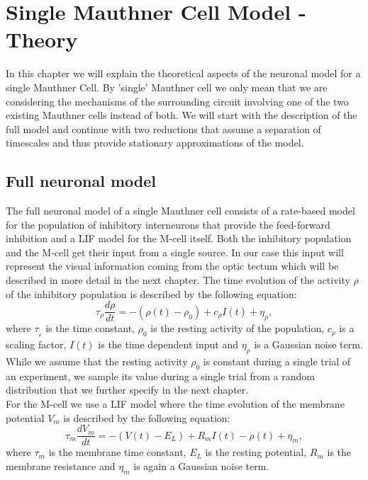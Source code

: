 \chapter{Single Mauthner Cell Model - Theory}
	In this chapter we will explain the theoretical aspects of the neuronal model for a single 
	Mauthner Cell.
	By 'single' Mauthner cell we only mean that we are considering the mechanisms of the 
	surrounding circuit involving one of the two existing Mauthner cells instead of both.
	We will start with the description of the full model and continue with two reductions that 
	assume a separation of timescales and thus provide stationary approximations of the model.
	\section{Full neuronal model}
	The full neuronal model of a single Mauthner cell consists of a rate-based model for the 
	population of inhibitory interneurons that provide the feed-forward inhibition and a LIF model 
	for the M-cell itself.
	Both the inhibitory population and the M-cell get their input from a single source.
	In our case this input will represent the visual information coming from the optic tectum which 
	will be described in more detail in the next chapter.
	The time evolution of the activity $\rho$ of the inhibitory population is described by the 
	following equation:
	\begin{equation}
	\tau _{\rho} \frac{d\rho}{dt} = - (\rho(t) - \rho_{0}) + c_{\rho} I(t) + 
	\eta _{\rho},
	\label{eq:inhib}
	\end{equation}
	where $\tau _{_\rho}$ is the time constant, $\rho _{0}$ is the resting activity of the 
	population, $c_{\rho}$ is a scaling factor, $I(t)$ is the time dependent input and $\eta 
	_{\rho}$ is a Gaussian noise term.
    While we assume that the resting activity $\rho_{0}$ is constant during a single trial of an experiment, we sample its value during a single trial from a random distribution that we further specify in the next chapter.\\
	For the M-cell we use a LIF model where the time evolution of the membrane potential $V_m$ is 
	described by the following equation:
	\begin{equation}
	\tau _m \frac{dV_m}{dt} = - (V(t) - E_{L}) + R_{m} I(t) - \rho (t) +  \eta 
	_m,
	\label{eq:mcell}
	\end{equation}
	where $\tau_{m}$ is the membrane time constant, $E_L$ is the resting potential, $R_m$ is the 
	membrane resistance and $\eta_{m}$ is again a Gaussian noise term.
